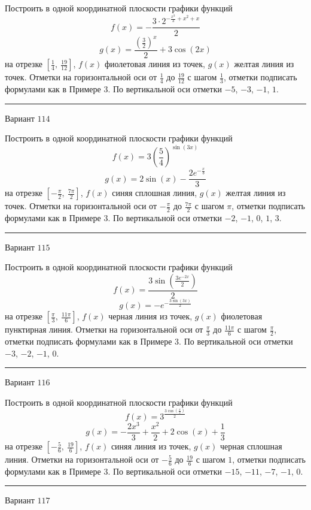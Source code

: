 \documentclass[11pt]{report}
\begin{document}
Построить в одной координатной плоскости графики функций $$f(x) = - \frac{3 \cdot 2^{- \frac{x^{3}}{3} + x^{2} + x}}{2}$$ $$g(x) = \frac{\left(\frac{3}{2}\right)^{x}}{2} + 3 \cos{\left(2 x \right)}$$ на отрезке $\left[\frac{1}{4}, \  \frac{19}{12}\right]$, $f(x)$ фиолетовая линия из точек, $g(x)$ желтая линия из точек. Отметки на горизонтальной оси от $\frac{1}{4}$ до $\frac{19}{12}$ с шагом $\frac{1}{3}$, отметки подписать формулами как в Примере 3. По вертикальной оси отметки $-5$, $-3$, $-1$, $1$.
\begin{center}
\noindent\rule{8cm}{0.4pt}
\end{center}
Вариант $114$


Построить в одной координатной плоскости графики функций $$f(x) = 3 \left(\frac{5}{4}\right)^{\sin{\left(3 x \right)}}$$ $$g(x) = 2 \sin{\left(x \right)} - \frac{2 e^{- \frac{x}{3}}}{3}$$ на отрезке $\left[- \frac{\pi}{2}, \  \frac{7 \pi}{2}\right]$, $f(x)$ синяя сплошная линия, $g(x)$ желтая линия из точек. Отметки на горизонтальной оси от $- \frac{\pi}{2}$ до $\frac{7 \pi}{2}$ с шагом $\pi$, отметки подписать формулами как в Примере 3. По вертикальной оси отметки $-2$, $-1$, $0$, $1$, $3$.
\begin{center}
\noindent\rule{8cm}{0.4pt}
\end{center}
Вариант $115$


Построить в одной координатной плоскости графики функций $$f(x) = \frac{3 \sin{\left(\frac{3 e^{- 2 x}}{2} \right)}}{2}$$ $$g(x) = - e^{- \frac{3 \sin{\left(3 x \right)}}{2}}$$ на отрезке $\left[\frac{\pi}{3}, \  \frac{11 \pi}{6}\right]$, $f(x)$ черная линия из точек, $g(x)$ фиолетовая пунктирная линия. Отметки на горизонтальной оси от $\frac{\pi}{3}$ до $\frac{11 \pi}{6}$ с шагом $\frac{\pi}{2}$, отметки подписать формулами как в Примере 3. По вертикальной оси отметки $-3$, $-2$, $-1$, $0$.
\begin{center}
\noindent\rule{8cm}{0.4pt}
\end{center}
Вариант $116$


Построить в одной координатной плоскости графики функций $$f(x) = 3^{\frac{3 \cos{\left(\frac{x}{2} \right)}}{2}}$$ $$g(x) = - \frac{2 x^{3}}{3} + \frac{x^{2}}{2} + 2 \cos{\left(x \right)} + \frac{1}{3}$$ на отрезке $\left[- \frac{5}{6}, \  \frac{19}{6}\right]$, $f(x)$ синяя линия из точек, $g(x)$ черная сплошная линия. Отметки на горизонтальной оси от $- \frac{5}{6}$ до $\frac{19}{6}$ с шагом $1$, отметки подписать формулами как в Примере 3. По вертикальной оси отметки $-15$, $-11$, $-7$, $-1$, $0$.
\begin{center}
\noindent\rule{8cm}{0.4pt}
\end{center}
Вариант $117$
\end{document}
